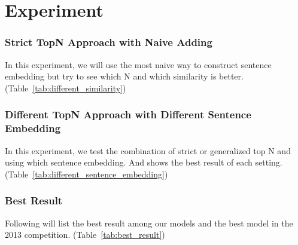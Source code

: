 \section{Experiment}
\label{sec:experiment}

\subsubsection*{Strict TopN Approach with Naive Adding}

In this experiment, we will use the most naive way to construct sentence embedding but try to see which N and which similarity is better. (Table~\ref{tab:different_similarity})



\subsubsection*{Different TopN Approach with Different Sentence Embedding}

In this experiment, we test the combination of strict or generalized top N and using which sentence embedding. And shows the best result of each setting. (Table~\ref{tab:different_sentence_embedding})



\subsubsection*{Best Result}

Following will list the best result among our models and the best model in the 2013 competition. (Table~\ref{tab:best_result})


